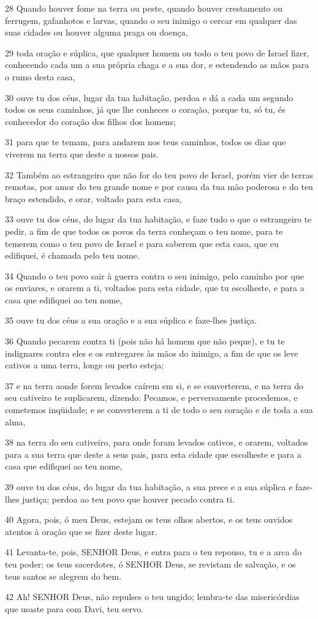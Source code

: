 \par 28 Quando houver fome na terra ou peste, quando houver crestamento ou ferrugem, gafanhotos e larvas, quando o seu inimigo o cercar em qualquer das suas cidades ou houver alguma praga ou doença,
\par 29 toda oração e súplica, que qualquer homem ou todo o teu povo de Israel fizer, conhecendo cada um a sua própria chaga e a sua dor, e estendendo as mãos para o rumo desta casa,
\par 30 ouve tu dos céus, lugar da tua habitação, perdoa e dá a cada um segundo todos os seus caminhos, já que lhe conheces o coração, porque tu, só tu, és conhecedor do coração dos filhos dos homens;
\par 31 para que te temam, para andarem nos teus caminhos, todos os dias que viverem na terra que deste a nossos pais.
\par 32 Também ao estrangeiro que não for do teu povo de Israel, porém vier de terras remotas, por amor do teu grande nome e por causa da tua mão poderosa e do teu braço estendido, e orar, voltado para esta casa,
\par 33 ouve tu dos céus, do lugar da tua habitação, e faze tudo o que o estrangeiro te pedir, a fim de que todos os povos da terra conheçam o teu nome, para te temerem como o teu povo de Israel e para saberem que esta casa, que eu edifiquei, é chamada pelo teu nome.
\par 34 Quando o teu povo sair à guerra contra o seu inimigo, pelo caminho por que os enviares, e orarem a ti, voltados para esta cidade, que tu escolheste, e para a casa que edifiquei ao teu nome,
\par 35 ouve tu dos céus a sua oração e a sua súplica e faze-lhes justiça.
\par 36 Quando pecarem contra ti (pois não há homem que não peque), e tu te indignares contra eles e os entregares às mãos do inimigo, a fim de que os leve cativos a uma terra, longe ou perto esteja;
\par 37 e na terra aonde forem levados caírem em si, e se converterem, e na terra do seu cativeiro te suplicarem, dizendo: Pecamos, e perversamente procedemos, e cometemos inqüidade; e se converterem a ti de todo o seu coração e de toda a sua alma,
\par 38 na terra do seu cativeiro, para onde foram levados cativos, e orarem, voltados para a sua terra que deste a seus pais, para esta cidade que escolheste e para a casa que edifiquei ao teu nome,
\par 39 ouve tu dos céus, do lugar da tua habitação, a sua prece e a sua súplica e faze-lhes justiça; perdoa ao teu povo que houver pecado contra ti.
\par 40 Agora, pois, ó meu Deus, estejam os teus olhos abertos, e os teus ouvidos atentos à oração que se fizer deste lugar.
\par 41 Levanta-te, pois, SENHOR Deus, e entra para o teu repouso, tu e a arca do teu poder; os teus sacerdotes, ó SENHOR Deus, se revistam de salvação, e os teus santos se alegrem do bem.
\par 42 Ah! SENHOR Deus, não repulses o teu ungido; lembra-te das misericórdias que usaste para com Davi, teu servo.

